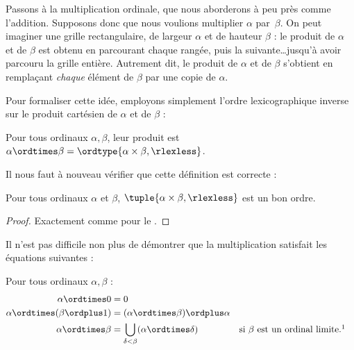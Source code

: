 \documentclass[../../../include/open-logic-section]{subfiles}
\begin{document}

Passons à la multiplication ordinale, que nous aborderons
à peu près comme l'addition. Supposons donc que nous
voulions multiplier $\alpha$ par~$\beta$. On peut
imaginer une grille rectangulaire, de largeur $\alpha$
et de hauteur $\beta$ : le produit de $\alpha$ et de
$\beta$ est obtenu en parcourant chaque rangée, puis
la suivante\ldots jusqu'à avoir parcouru la grille
entière. Autrement dit, le produit de $\alpha$ et
de $\beta$ s'obtient en remplaçant \emph{chaque}
élément de $\beta$ par une copie de $\alpha$.

Pour formaliser cette idée, employons simplement
l'ordre lexicographique inverse sur le produit
cartésien de $\alpha$ et de $\beta$ :

\begin{defn}
Pour tous ordinaux $\alpha, \beta$, leur produit est
$\alpha \ordtimes \beta =
\ordtype{\alpha \times \beta, \rlexless}$.
\end{defn}
\noindent
Il nous faut à nouveau vérifier que cette définition
est correcte :

\begin{lem}
Pour tous ordinaux $\alpha$ et $\beta$,
$\tuple{\alpha \times \beta, \rlexless}$
est un bon ordre.
\end{lem}

\begin{proof}
Exactement comme pour le .
\end{proof}
\noindent
Il n'est pas difficile non plus de démontrer que la
multiplication satisfait les équations suivantes :

\begin{lem}
Pour tous ordinaux $\alpha, \beta$ :
\begin{align*}
	\alpha \ordtimes 0 &= 0\\
	\alpha \ordtimes (\beta \ordplus 1)
	&= (\alpha \ordtimes \beta) \ordplus \alpha\\
	\alpha \ordtimes \beta
	&= \bigcup_{\delta < \beta}
	(\alpha \ordtimes \delta)
	&& \text{si $\beta$ est un ordinal limite}.\footnotemark
\end{align*}
\end{lem}
\end{document}
